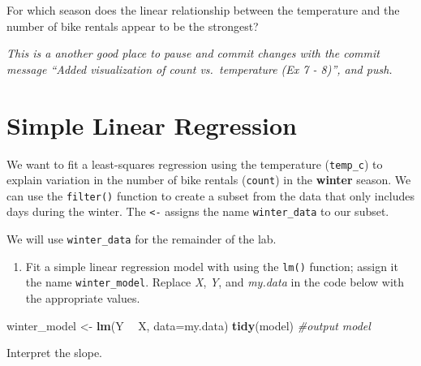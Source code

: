 \documentclass[]{book}
\newenvironment{Shaded}{\begin{snugshade}}{\end{snugshade}}
\newcommand{\KeywordTok}[1]{\textcolor[rgb]{0.13,0.29,0.53}{\textbf{#1}}}
\newcommand{\DataTypeTok}[1]{\textcolor[rgb]{0.13,0.29,0.53}{#1}}
\newcommand{\StringTok}[1]{\textcolor[rgb]{0.31,0.60,0.02}{#1}}
\newcommand{\CommentTok}[1]{\textcolor[rgb]{0.56,0.35,0.01}{\textit{#1}}}
\newcommand{\OperatorTok}[1]{\textcolor[rgb]{0.81,0.36,0.00}{\textbf{#1}}}
\newcommand{\NormalTok}[1]{#1}
\providecommand{\tightlist}{%
  \setlength{\itemsep}{0pt}\setlength{\parskip}{0pt}}
\begin{document}
For which season does the linear relationship between the temperature
and the number of bike rentals appear to be the strongest?

\emph{This is a another good place to pause and commit changes with the
commit message ``Added visualization of count vs.~temperature (Ex 7 -
8)'', and push.}

\section{Simple Linear Regression}\label{simple-linear-regression}

We want to fit a least-squares regression using the temperature
(\texttt{temp\_c}) to explain variation in the number of bike rentals
(\texttt{count}) in the \textbf{winter} season. We can use the
\texttt{filter()} function to create a subset from the data that only
includes days during the winter. The \texttt{\textless{}-} assigns the
name \texttt{winter\_data} to our subset.

\begin{Shaded}
\end{Shaded}

We will use \texttt{winter\_data} for the remainder of the lab.

\begin{enumerate}
\def\labelenumi{\arabic{enumi}.}
\setcounter{enumi}{8}
\tightlist
\item
  Fit a simple linear regression model with using the \texttt{lm()}
  function; assign it the name \texttt{winter\_model}. Replace \emph{X},
  \emph{Y}, and \emph{my.data} in the code below with the appropriate
  values.
\end{enumerate}

\begin{Shaded}
\begin{Highlighting}[]
\NormalTok{winter_model <-}\StringTok{ }\KeywordTok{lm}\NormalTok{(Y }\OperatorTok{~}\StringTok{ }\NormalTok{X, }\DataTypeTok{data=}\NormalTok{my.data)}
\KeywordTok{tidy}\NormalTok{(model) }\CommentTok{#output model}
\end{Highlighting}
\end{Shaded}

Interpret the slope.
\end{document}
